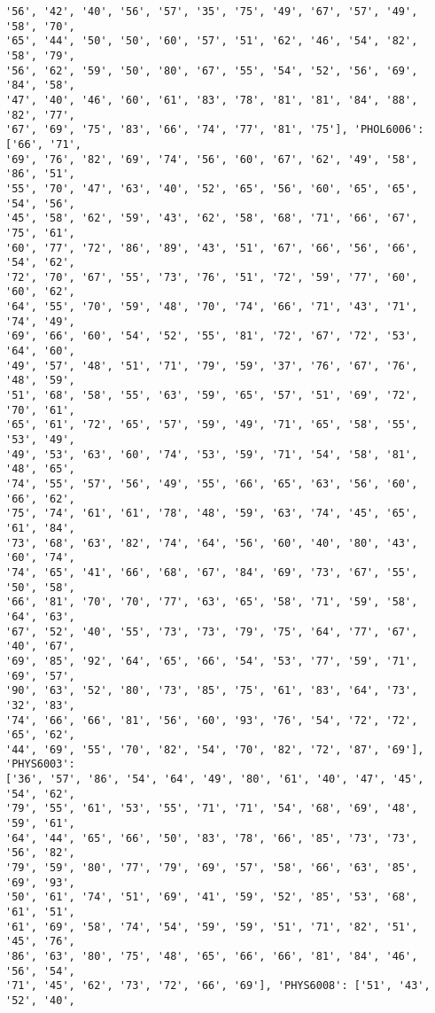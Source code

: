 \documentclass[11pt]{article}
\begin{document}
\begin{Verbatim}[commandchars=\\\{\}]
'56', '42', '40', '56', '57', '35', '75', '49', '67', '57', '49', '58', '70',
'65', '44', '50', '50', '60', '57', '51', '62', '46', '54', '82', '58', '79',
'56', '62', '59', '50', '80', '67', '55', '54', '52', '56', '69', '84', '58',
'47', '40', '46', '60', '61', '83', '78', '81', '81', '84', '88', '82', '77',
'67', '69', '75', '83', '66', '74', '77', '81', '75'], 'PHOL6006': ['66', '71',
'69', '76', '82', '69', '74', '56', '60', '67', '62', '49', '58', '86', '51',
'55', '70', '47', '63', '40', '52', '65', '56', '60', '65', '65', '54', '56',
'45', '58', '62', '59', '43', '62', '58', '68', '71', '66', '67', '75', '61',
'60', '77', '72', '86', '89', '43', '51', '67', '66', '56', '66', '54', '62',
'72', '70', '67', '55', '73', '76', '51', '72', '59', '77', '60', '60', '62',
'64', '55', '70', '59', '48', '70', '74', '66', '71', '43', '71', '74', '49',
'69', '66', '60', '54', '52', '55', '81', '72', '67', '72', '53', '64', '60',
'49', '57', '48', '51', '71', '79', '59', '37', '76', '67', '76', '48', '59',
'51', '68', '58', '55', '63', '59', '65', '57', '51', '69', '72', '70', '61',
'65', '61', '72', '65', '57', '59', '49', '71', '65', '58', '55', '53', '49',
'49', '53', '63', '60', '74', '53', '59', '71', '54', '58', '81', '48', '65',
'74', '55', '57', '56', '49', '55', '66', '65', '63', '56', '60', '66', '62',
'75', '74', '61', '61', '78', '48', '59', '63', '74', '45', '65', '61', '84',
'73', '68', '63', '82', '74', '64', '56', '60', '40', '80', '43', '60', '74',
'74', '65', '41', '66', '68', '67', '84', '69', '73', '67', '55', '50', '58',
'66', '81', '70', '70', '77', '63', '65', '58', '71', '59', '58', '64', '63',
'67', '52', '40', '55', '73', '73', '79', '75', '64', '77', '67', '40', '67',
'69', '85', '92', '64', '65', '66', '54', '53', '77', '59', '71', '69', '57',
'90', '63', '52', '80', '73', '85', '75', '61', '83', '64', '73', '32', '83',
'74', '66', '66', '81', '56', '60', '93', '76', '54', '72', '72', '65', '62',
'44', '69', '55', '70', '82', '54', '70', '82', '72', '87', '69'], 'PHYS6003':
['36', '57', '86', '54', '64', '49', '80', '61', '40', '47', '45', '54', '62',
'79', '55', '61', '53', '55', '71', '71', '54', '68', '69', '48', '59', '61',
'64', '44', '65', '66', '50', '83', '78', '66', '85', '73', '73', '56', '82',
'79', '59', '80', '77', '79', '69', '57', '58', '66', '63', '85', '69', '93',
'50', '61', '74', '51', '69', '41', '59', '52', '85', '53', '68', '61', '51',
'61', '69', '58', '74', '54', '59', '59', '51', '71', '82', '51', '45', '76',
'86', '63', '80', '75', '48', '65', '66', '66', '81', '84', '46', '56', '54',
'71', '45', '62', '73', '72', '66', '69'], 'PHYS6008': ['51', '43', '52', '40',

\end{Verbatim}
\end{document}
